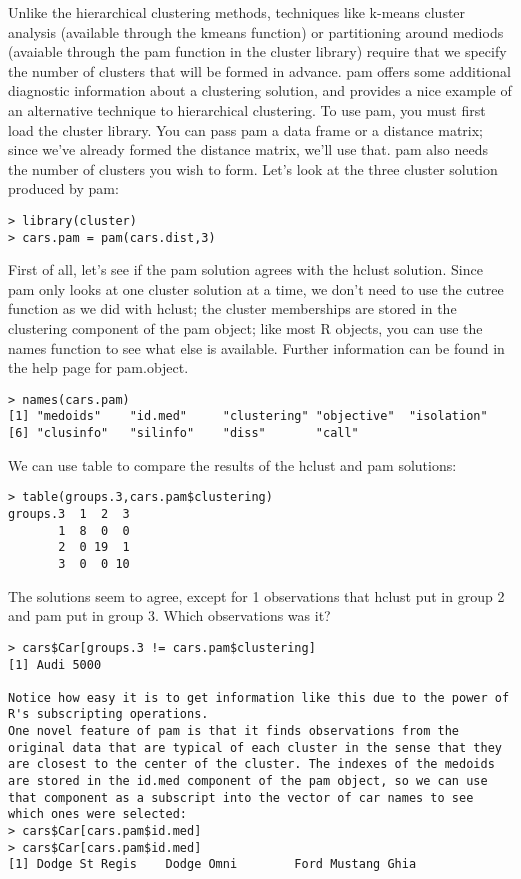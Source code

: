 {Unlike the hierarchical clustering methods, techniques like k-means cluster analysis (available through the kmeans function) or partitioning around mediods (avaiable through the pam function in the cluster library) require that we specify the number of clusters that will be formed in advance. pam offers some additional diagnostic information about a clustering solution, and provides a nice example of an alternative technique to hierarchical clustering. To use pam, you must first load the cluster library. You can pass pam a data frame or a distance matrix; since we've already formed the distance matrix, we'll use that. pam also needs the number of clusters you wish to form. Let's look at the three cluster solution produced by pam:
\begin{framed}
\begin{verbatim}
> library(cluster)
> cars.pam = pam(cars.dist,3)
\end{verbatim}
\end{framed}
First of all, let's see if the pam solution agrees with the hclust solution. Since pam only looks at one cluster solution at a time, we don't need to use the cutree function as we did with hclust; the cluster memberships are stored in the clustering component of the pam object; like most R objects, you can use the names function to see what else is available. Further information can be found in the help page for pam.object.
\begin{framed}
\begin{verbatim}
> names(cars.pam)
[1] "medoids"    "id.med"     "clustering" "objective"  "isolation"
[6] "clusinfo"   "silinfo"    "diss"       "call"
\end{verbatim}
\end{framed}
We can use table to compare the results of the hclust and pam solutions:
\begin{framed}
\begin{verbatim}
> table(groups.3,cars.pam$clustering)
groups.3  1  2  3
       1  8  0  0
       2  0 19  1
       3  0  0 10
\end{verbatim}
\end{framed}
The solutions seem to agree, except for 1 observations that hclust put in group 2 and pam put in group 3. Which observations was it?
\begin{framed}
\begin{verbatim}
> cars$Car[groups.3 != cars.pam$clustering]
[1] Audi 5000

Notice how easy it is to get information like this due to the power of R's subscripting operations.
One novel feature of pam is that it finds observations from the original data that are typical of each cluster in the sense that they are closest to the center of the cluster. The indexes of the medoids are stored in the id.med component of the pam object, so we can use that component as a subscript into the vector of car names to see which ones were selected:
> cars$Car[cars.pam$id.med]
> cars$Car[cars.pam$id.med]
[1] Dodge St Regis    Dodge Omni        Ford Mustang Ghia


\end{verbatim}
\end{framed}}
